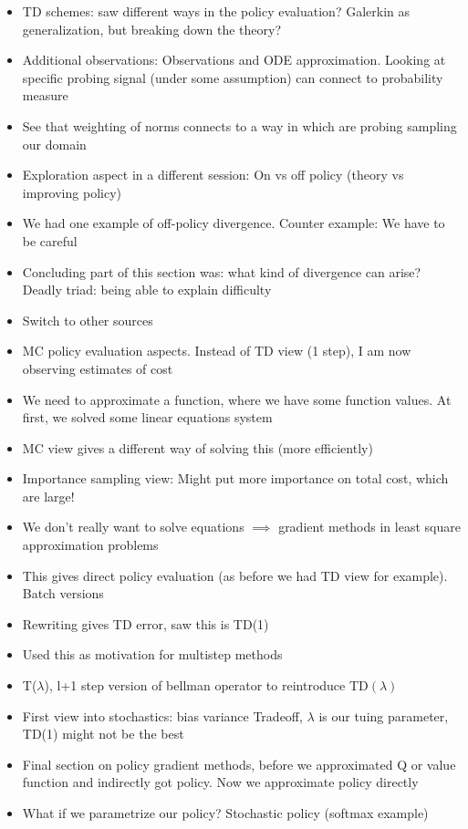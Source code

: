 \begin{itemize}
    \item TD schemes: saw different ways in the policy evaluation? Galerkin as generalization, but breaking down the theory? 
    \item Additional observations: Observations and ODE approximation. Looking at specific probing signal (under some assumption) can connect to probability measure 
    \item See that weighting of norms connects to a way in which are probing sampling our domain 
    \item Exploration aspect in a different session: On vs off policy (theory vs improving policy)
    \item We had one example of off-policy divergence. Counter example: We have to be careful 
    \item Concluding part of this section was: what kind of divergence can arise? Deadly triad: being able to explain difficulty 
    \item Switch to other sources 
    \item MC policy evaluation aspects. Instead of TD view (1 step), I am now observing estimates of cost 
    \item We need to approximate a function, where we have some function values. At first, we solved some linear equations system 
    \item MC view gives a different way of solving this (more efficiently)
    \item Importance sampling view: Might put more importance on total cost, which are large! 
    \item We don't really want to solve equations \(\implies\) gradient methods in least square approximation problems 
    \item This gives direct policy evaluation (as before we had TD view for example). Batch versions 
    \item Rewriting gives TD error, saw this is TD(1)
    \item Used this as motivation for multistep methods 
    \item T(\(\lambda\)), l+1 step version of bellman operator to reintroduce TD\((\lambda)\)
    \item First view into stochastics: bias variance Tradeoff, \(\lambda\) is our tuing parameter, TD(1) might not be the best
    \item Final section on policy gradient methods, before we approximated Q or value function and indirectly got policy. Now we approximate policy directly
    \item What if we parametrize our policy? Stochastic policy (softmax example)

\end{itemize}
